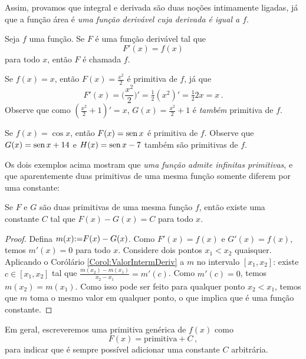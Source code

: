 Assim, provamos que integral e derivada são duas noções intimamente ligadas, já
que a função área é \emph{uma função derivável cuja
derivada é igual a $f$}. 

\begin{defin}
Seja $f$ uma função. Se $F$ é uma função derivável tal que $$F'(x)=f(x)$$ 
para todo $x$, então $F$ é chamada  $f$.
\end{defin}

\begin{ex} Se $f(x)=x$, então
$F(x)=\frac{x^2}{2}$ é primitiva de $f$, já que
$$F'(x)=\bigl(\frac{x^2}{2}\bigr)'=\tfrac12(x^2)'=\tfrac12 2x=x\,.$$
Observe que como $(\frac{x^2}{2}+1)'=x$,
$G(x)=\frac{x^2}{2}+1$ é \emph{também} primitiva de $f$.
\end{ex}

\begin{ex}
Se $f(x)=\cos x$, então $F(x)=\operatorname{sen} x$ é primitiva de $f$. Observe que
$G(x)=\operatorname{sen} x+14$ e $H(x)=\operatorname{sen} x-7$ também são primitivas de $f$.
\end{ex}

Os dois exemplos acima mostram que \emph{uma função admite infinitas
primitivas}, e que aparentemente duas primitivas de uma mesma função somente
diferem por uma constante:

\begin{lem}
 Se $F$ e $G$ são duas primitivas de uma mesma função $f$, então existe uma
constante $C$ tal que $F(x)-G(x)=C$ para todo $x$.
\end{lem}
\begin{proof}
Defina $m(x){:=} F(x)-G(x)$. Como $F'(x)=f(x)$ e $G'(x)=f(x)$, temos 
$m'(x)=0$ para todo
$x$. Considere dois pontos $x_1<x_2$ quaisquer. Aplicando o Corólário
\eqref{Corol:ValorIntermDeriv} a $m$ no intervalo $[x_1,x_2]$: existe $c\in
[x_1,x_2]$ tal que $\frac{m(x_2)-m(x_1)}{x_2-x_1}=m'(c)$. Como $m'(c)=0$, temos
$m(x_2)=m(x_1)$. Como isso pode ser feito para qualquer ponto $x_2<x_1$, temos
que $m$ toma o mesmo valor em qualquer ponto, o que implica que é uma função
constante.
\end{proof}

Em geral, escreveremos uma primitiva genérica de $f(x)$ como
$$F(x)=\text{primitiva}+C\,,$$ 
para indicar que é sempre possível adicionar uma constante $C$ arbitrária.

